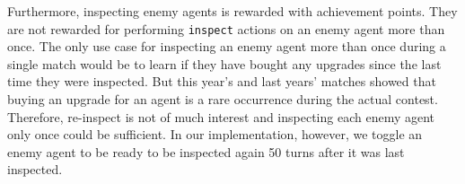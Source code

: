 \begin{description}
        Furthermore, inspecting enemy agents is rewarded with achievement points.
        They are not rewarded for performing \texttt{inspect} actions on an enemy agent more than once.
        The only use case for inspecting an enemy agent more than once during a single match would be to learn if they have bought any upgrades since the last time they were inspected.
        But this year's and last years' matches showed that buying an upgrade for an agent is a rare occurrence during the actual contest.
        Therefore, re-inspect is not of much interest and inspecting each enemy agent only once could be sufficient.
        In our implementation, however, we toggle an enemy agent to be ready to be inspected again 50 turns after it was last inspected.
\end{description}
